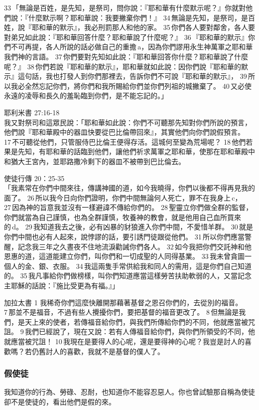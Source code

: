 33 「無論是百姓，是先知，是祭司，問你說：『耶和華有什麼默示呢？』你就對他們說：『什麼默示啊？耶和華說：我要撇棄你們！』 34 無論是先知，是祭司，是百姓，說『耶和華的默示』，我必刑罰那人和他的家。 35 你們各人要對鄰舍，各人要對弟兄如此說：『耶和華回答什麼？耶和華說了什麼呢？』 36 『耶和華的默示』你們不可再提，各人所說的話必做自己的重擔 a，因為你們謬用永生神萬軍之耶和華我們神的言語。 37 你們要對先知如此說：『耶和華回答你什麼？耶和華說了什麼呢？』 38 你們若說『耶和華的默示』，耶和華就如此說：因你們說『耶和華的默示』這句話，我也打發人到你們那裡去，告訴你們不可說『耶和華的默示』， 39 所以我必全然忘記你們，將你們和我所賜給你們並你們列祖的城撇棄了。 40 又必使永遠的凌辱和長久的羞恥臨到你們，是不能忘記的。」

耶利米書 27:16-18\\
我又對祭司和這眾民說：「耶和華如此說：你們不可聽那先知對你們所說的預言，他們說『耶和華殿中的器皿快要從巴比倫帶回來』，其實他們向你們說假預言。 17 不可聽從他們，只管服侍巴比倫王便得存活。這城何至變為荒場呢？ 18 他們若果是先知，有耶和華的話臨到他們，讓他們祈求萬軍之耶和華，使那在耶和華殿中和猶大王宮內，並耶路撒冷剩下的器皿不被帶到巴比倫去。

使徒行傳 20：25-35 \\
 「我素常在你們中間來往，傳講神國的道，如今我曉得，你們以後都不得再見我的面了。 26 所以我今日向你們證明，你們中間無論何人死亡，罪不在我身上 c， 27 因為神的旨意我並沒有一樣避諱不傳給你們的。 28 聖靈立你們做全群的監督，你們就當為自己謹慎，也為全群謹慎，牧養神的教會，就是他用自己血所買來的 d。 29 我知道我去之後，必有凶暴的豺狼進入你們中間，不愛惜羊群。 30 就是你們中間也必有人起來，說悖謬的話，要引誘門徒跟從他們。 31 所以你們應當警醒，記念我三年之久晝夜不住地流淚勸誡你們各人。 32 如今我把你們交託神和他恩惠的道，這道能建立你們，叫你們和一切成聖的人同得基業。 33 我未曾貪圖一個人的金、銀、衣服。 34 我這兩隻手常供給我和同人的需用，這是你們自己知道的。 35 我凡事給你們做榜樣，叫你們知道應當這樣勞苦扶助軟弱的人，又當記念主耶穌的話說：『施比受更為有福。』」
 
 加拉太書 1
 我稀奇你們這麼快離開那藉著基督之恩召你們的，去從別的福音。 7 那並不是福音，不過有些人攪擾你們，要把基督的福音更改了。 8 但無論是我們，是天上來的使者，若傳福音給你們，與我們所傳給你們的不同，他就應當被咒詛。 9 我們已經說了，現在又說：若有人傳福音給你們，與你們所領受的不同，他就應當被咒詛！ 10 我現在是要得人的心呢，還是要得神的心呢？我豈是討人的喜歡嗎？若仍舊討人的喜歡，我就不是基督的僕人了。
 
 \subsubsection{假使徒}
 我知道你的行為、勞碌、忍耐，也知道你不能容忍惡人。你也曾試驗那自稱為使徒卻不是使徒的，看出他們是假的來。
 
